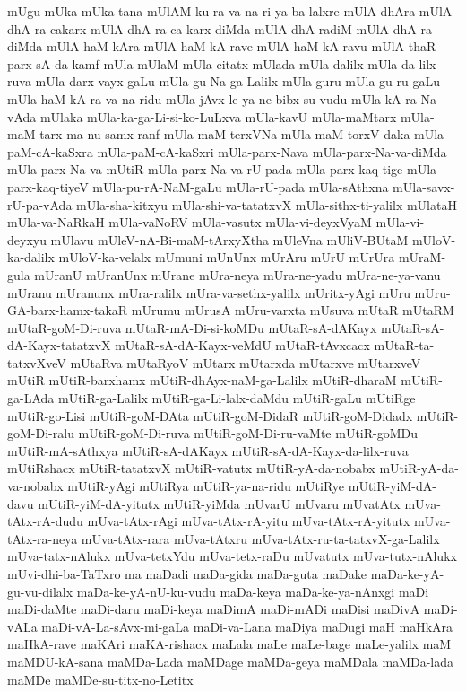 {mUgu
mUka
mUka-tana
mUlAM-ku-ra-va-na-ri-ya-ba-lalxre
mUlA-dhAra
mUlA-dhA-ra-cakarx
mUlA-dhA-ra-ca-karx-diMda
mUlA-dhA-radiM
mUlA-dhA-ra-diMda
mUlA-haM-kAra
mUlA-haM-kA-rave
mUlA-haM-kA-ravu
mUlA-thaR-parx-sA-da-kamf
mUla
mUlaM
mUla-citatx
mUlada
mUla-dalilx
mUla-da-lilx-ruva
mUla-darx-vayx-gaLu
mUla-gu-Na-ga-Lalilx
mUla-guru
mUla-gu-ru-gaLu
mUla-haM-kA-ra-va-na-ridu
mUla-jAvx-le-ya-ne-bibx-su-vudu
mUla-kA-ra-Na-vAda
mUlaka
mUla-ka-ga-Li-si-ko-LuLxva
mUla-kavU
mUla-maMtarx
mUla-maM-tarx-ma-nu-samx-ranf
mUla-maM-terxVNa
mUla-maM-torxV-daka
mUla-paM-cA-kaSxra
mUla-paM-cA-kaSxri
mUla-parx-Nava
mUla-parx-Na-va-diMda
mUla-parx-Na-va-mUtiR
mUla-parx-Na-va-rU-pada
mUla-parx-kaq-tige
mUla-parx-kaq-tiyeV
mUla-pu-rA-NaM-gaLu
mUla-rU-pada
mUla-sAthxna
mUla-savx-rU-pa-vAda
mUla-sha-kitxyu
mUla-shi-va-tatatxvX
mUla-sithx-ti-yalilx
mUlataH
mUla-va-NaRkaH
mUla-vaNoRV
mUla-vasutx
mUla-vi-deyxVyaM
mUla-vi-deyxyu
mUlavu
mUleV-nA-Bi-maM-tArxyXtha
mUleVna
mUliV-BUtaM
mUloV-ka-dalilx
mUloV-ka-velalx
mUmuni
mUnUnx
mUrAru
mUrU
mUrUra
mUraM-gula
mUranU
mUranUnx
mUrane
mUra-neya
mUra-ne-yadu
mUra-ne-ya-vanu
mUranu
mUranunx
mUra-ralilx
mUra-va-sethx-yalilx
mUritx-yAgi
mUru
mUru-GA-barx-hamx-takaR
mUrumu
mUrusA
mUru-varxta
mUsuva
mUtaR
mUtaRM
mUtaR-goM-Di-ruva
mUtaR-mA-Di-si-koMDu
mUtaR-sA-dAKayx
mUtaR-sA-dA-Kayx-tatatxvX
mUtaR-sA-dA-Kayx-veMdU
mUtaR-tAvxcacx
mUtaR-ta-tatxvXveV
mUtaRva
mUtaRyoV
mUtarx
mUtarxda
mUtarxve
mUtarxveV
mUtiR
mUtiR-barxhamx
mUtiR-dhAyx-naM-ga-Lalilx
mUtiR-dharaM
mUtiR-ga-LAda
mUtiR-ga-Lalilx
mUtiR-ga-Li-lalx-daMdu
mUtiR-gaLu
mUtiRge
mUtiR-go-Lisi
mUtiR-goM-DAta
mUtiR-goM-DidaR
mUtiR-goM-Didadx
mUtiR-goM-Di-ralu
mUtiR-goM-Di-ruva
mUtiR-goM-Di-ru-vaMte
mUtiR-goMDu
mUtiR-mA-sAthxya
mUtiR-sA-dAKayx
mUtiR-sA-dA-Kayx-da-lilx-ruva
mUtiRshacx
mUtiR-tatatxvX
mUtiR-vatutx
mUtiR-yA-da-nobabx
mUtiR-yA-da-va-nobabx
mUtiR-yAgi
mUtiRya
mUtiR-ya-na-ridu
mUtiRye
mUtiR-yiM-dA-davu
mUtiR-yiM-dA-yitutx
mUtiR-yiMda
mUvarU
mUvaru
mUvatAtx
mUva-tAtx-rA-dudu
mUva-tAtx-rAgi
mUva-tAtx-rA-yitu
mUva-tAtx-rA-yitutx
mUva-tAtx-ra-neya
mUva-tAtx-rara
mUva-tAtxru
mUva-tAtx-ru-ta-tatxvX-ga-Lalilx
mUva-tatx-nAlukx
mUva-tetxYdu
mUva-tetx-raDu
mUvatutx
mUva-tutx-nAlukx
mUvi-dhi-ba-TaTxro
ma
maDadi
maDa-gida
maDa-guta
maDake
maDa-ke-yA-gu-vu-dilalx
maDa-ke-yA-nU-ku-vudu
maDa-keya
maDa-ke-ya-nAnxgi
maDi
maDi-daMte
maDi-daru
maDi-keya
maDimA
maDi-mADi
maDisi
maDivA
maDi-vALa
maDi-vA-La-sAvx-mi-gaLa
maDi-va-Lana
maDiya
maDugi
maH
maHkAra
maHkA-rave
maKAri
maKA-rishacx
maLala
maLe
maLe-bage
maLe-yalilx
maM
maMDU-kA-sana
maMDa-Lada
maMDage
maMDa-geya
maMDala
maMDa-lada
maMDe
maMDe-su-titx-no-Letitx
}
